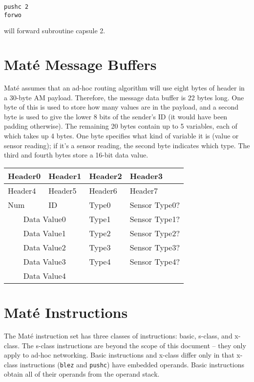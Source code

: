 \documentclass[10pt]{article}
\def\Mate{{Mat\'{e} }}
\begin{document}
\begin{verbatim}
pushc 2
forwo
\end{verbatim}

will forward subroutine capsule 2.

\section*{\Mate Message Buffers}

\Mate assumes that an ad-hoc routing algorithm will use eight bytes of
header in a 30-byte AM payload. Therefore, the message data buffer is
22 bytes long. One byte of this is used to store how many values are
in the payload, and a second byte is used to give the lower 8 bits of
the sender's ID (it would have been padding otherwise). The remaining
20 bytes contain up to 5 variables, each of which takes up 4
bytes. One byte specifies what kind of variable it is (value or sensor
reading); if it's a sensor reading, the second byte indicates which
type. The third and fourth bytes store a 16-bit data value.

\vspace{0.2cm}

\begin{tabular}{|p{1in}|p{1in}|p{1in}|p{1in}|}\hline 
Header0 & Header1 & Header2 & Header3 \\ \hline
Header4 & Header5 & Header6 & Header7 \\ \hline
Num    &  ID    & Type0   & Sensor Type0? \\ \hline
\multicolumn{2}{|c|}{Data Value0} & Type1 & Sensor Type1? \\ \hline
\multicolumn{2}{|c|}{Data Value1} & Type2 & Sensor Type2? \\ \hline
\multicolumn{2}{|c|}{Data Value2} & Type3 & Sensor Type3? \\ \hline
\multicolumn{2}{|c|}{Data Value3} & Type4 & Sensor Type4? \\ \hline
\multicolumn{2}{|c|}{Data Value4} & \multicolumn{2}{|c|}{}\\\hline
\end{tabular}
\section*{\Mate Instructions}

The \Mate instruction set has three classes of instructions: basic,
s-class, and x-class. The s-class instructions are beyond the scope of
this document -- they only apply to ad-hoc networking. Basic
instructions and x-class differ only in that x-class instructions
({\tt blez} and {\tt pushc}) have embedded operands. Basic
instructions obtain all of their operands from the operand stack.
\end{document}
